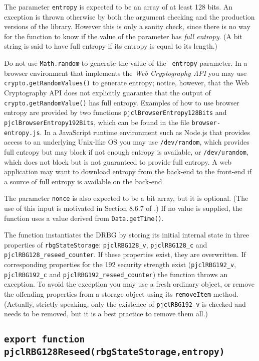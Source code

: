 \documentclass[12pt]{article}
\begin{document}
The parameter {\tt entropy} is expected to be an array of at least 128
bits.  An exception is thrown
otherwise by both the argument checking and the production versions of
the library.  However this is only a sanity check, since there is no
way for the function to know if the value of the parameter has {\em
  full entropy}.  (A bit string is said to have full entropy if its
entropy is equal to its length.)

Do not use {\tt Math.random} to generate the value of the {\tt
  entropy} parameter.  In a browser environment that
implements the {\em Web Cryptography API\/} you may use
{\tt crypto.getRandomValues()} to generate entropy;
notice, however, that the Web Cryptography API
does not explicitly guarantee that the output of {\tt
  crypto.getRandomValue()} has full entropy.  
Examples of how to use browser entropy
are provided by two functions {\tt pjclBrowserEntropy128Bits}
and {\tt pjclBrowserEntropy192Bits}, which
can be found in the file {\tt browser-entropy.js}.
In a JavaScript runtime environment such as Node.js 
that provides access to an underlying Unix-like OS you may
use {\tt /dev/random}, which provides full entropy but
may block if not enough entropy is available, or {\tt /dev/urandom},
which does not block but is not guaranteed to provide full entropy.  A
web application may want to download entropy from the back-end to the
front-end if a source of full entropy is available on the back-end.

The parameter {\tt nonce} is also expected to be a bit array, but it is optional.  
(The use of this input is motivated in Section 8.6.7 of \cite{SP800-90Ar1}.)  If no value is
supplied, the function uses a value derived from {\tt Data.getTime()}.

The function instantiates the DRBG by storing its initial internal
state in three properties of {\tt rbgStateStorage}: {\tt pjclRBG128\_v}, 
{\tt pjclRBG128\_c} and {\tt pjclRBG128\_reseed\_counter}.  If these
properties exist, they are overwritten.  If corresponding properties for
the 192 security strength exist ({\tt pjclRBG192\_v}, {\tt pjclRBG192\_c}
and {\tt pjclRBG192\_reseed\_counter}) the function 
throws an exception.  To avoid the exception you may use a fresh ordinary
object, or remove the offending properties from a storage object
using its {\tt removeItem} method.  (Actually, strictly speaking, only the existence of
{\tt pjclRBG192\_v} is checked and needs to be
removed, but it is a best practice to remove them all.)

\subsection{\tt export function pjclRBG128Reseed(rbgStateStorage,entropy)}
\end{document}
